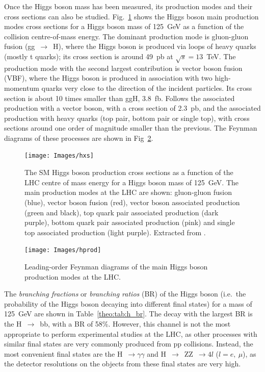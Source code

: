 \documentclass[../main.tex]{subfiles}
\begin{document}
Once the Higgs boson mass has been measured, its production modes and their cross sections can also be studied. Fig.~\ref{theo:fig:h_production_xs} shows the Higgs boson main production modes cross sections for a Higgs boson mass of 125~GeV as a function of the collision centre-of-mass energy. The dominant production mode is gluon-gluon fusion (gg~$\to$~H), where the Higgs boson is produced via loops of heavy quarks (mostly t quarks); its cross section is around 49~pb at $\sqrt{s}=13$~TeV. The production mode with the second largest contribution is vector boson fusion (VBF), where the Higgs boson is produced in association with two high-momentum quarks very close to the direction of the incident particles. Its cross section is about 10 times smaller than ggH, 3.8~fb. Follows the associated production with a vector boson, with a cross section of 2.3~pb, and the associated production with heavy quarks (top pair, bottom pair or single top), with cross sections around one order of magnitude smaller than the previous. The Feynman diagrams of these processes are shown in Fig~\ref{theo:fig:h_feynman}.

\begin{figure}[h!]
\begin{center}
\texttt{[image: Images/hxs]}
\end{center}
\caption{The SM Higgs boson production cross sections as a function of the LHC centre of mass energy for a Higgs boson mass of 125~GeV. The main production modes at the LHC are shown: gluon-gluon fusion (blue), vector boson fusion (red), vector boson associated production (green and black), top quark pair associated production (dark purple), bottom quark pair associated production (pink) and single top associated production (light purple). Extracted from \cite{intro:theo:yellow_higgs}.}
\label{theo:fig:h_production_xs}
\end{figure}

\begin{figure}[h!]
\begin{center}
\texttt{[image: Images/hprod]}
\end{center}
\caption{Leading-order Feynman diagrams of the main Higgs boson production modes at the LHC.}
\label{theo:fig:h_feynman}
\end{figure}

The \textit{branching fractions} or \textit{branching ratios} (BR) of the Higgs boson (i.e.~the probability of the Higgs boson decaying into different final states) for a mass of 125~GeV are shown in Table~\ref{theo:tab:h_br}. The decay with the largest BR is the H~$\to$~bb, with a BR of 58\%. However, this channel is not the most appropriate to perform experimental studies at the LHC, as other processes with similar final states are very commonly produced from pp collisions. Instead, the most convenient final states are the H~$\to\gamma\gamma$ and H~$\to$~ZZ~$\to4l$ ($l=e,~\mu$), as the detector resolutions on the objects from  these final states are very high.
\end{document}

